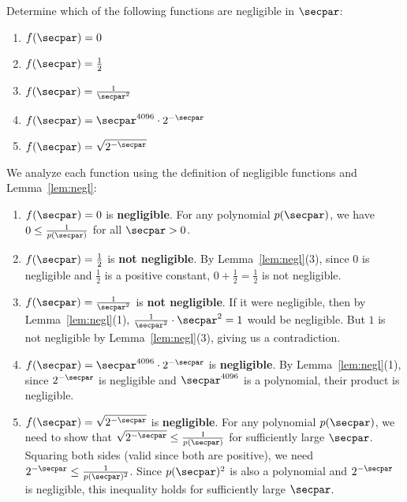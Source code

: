 \begin{exercise}\label{ex:negligible-functions}
  Determine which of the following functions are negligible in $\secpar$:
  \begin{enumerate}
    \item $f(\secpar) = 0$
    \item $f(\secpar) = \frac{1}{2}$
    \item $f(\secpar) = \frac{1}{\secpar^2}$
    \item $f(\secpar) = \secpar^{4096} \cdot 2^{-\secpar}$
    \item $f(\secpar) = \sqrt{2^{-\secpar}}$
  \end{enumerate}
\end{exercise}

\ifsolutions
\begin{mysolution}
  We analyze each function using the definition of negligible functions and Lemma~\ref{lem:negl}:
  \begin{enumerate}
    \item $f(\secpar) = 0$ is \textbf{negligible}.
    For any polynomial $p(\secpar)$, we have $0 \le \frac{1}{p(\secpar)}$ for all $\secpar > 0$.
    
    \item $f(\secpar) = \frac{1}{2}$ is \textbf{not negligible}.
    By Lemma~\ref{lem:negl}(3), since $0$ is negligible and $\frac{1}{2}$ is a positive constant, $0 + \frac{1}{2} = \frac{1}{2}$ is not negligible.
    
    \item $f(\secpar) = \frac{1}{\secpar^2}$ is \textbf{not negligible}.
    If it were negligible, then by Lemma~\ref{lem:negl}(1), $\frac{1}{\secpar^2} \cdot \secpar^2 = 1$ would be negligible.
    But $1$ is not negligible by Lemma~\ref{lem:negl}(3), giving us a contradiction.
    
    \item $f(\secpar) = \secpar^{4096} \cdot 2^{-\secpar}$ is \textbf{negligible}.
    By Lemma~\ref{lem:negl}(1), since $2^{-\secpar}$ is negligible and $\secpar^{4096}$ is a polynomial, their product is negligible.
    
    \item $f(\secpar) = \sqrt{2^{-\secpar}}$ is \textbf{negligible}.
    For any polynomial $p(\secpar)$, we need to show that $\sqrt{2^{-\secpar}} \le \frac{1}{p(\secpar)}$ for sufficiently large $\secpar$.
    Squaring both sides (valid since both are positive), we need $2^{-\secpar} \le \frac{1}{p(\secpar)^2}$.
    Since $p(\secpar)^2$ is also a polynomial and $2^{-\secpar}$ is negligible, this inequality holds for sufficiently large $\secpar$.
  \end{enumerate}
\end{mysolution}
\fi

